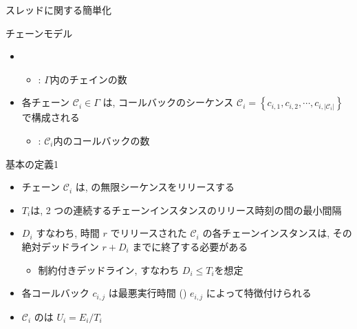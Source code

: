 \begin{frame}{スレッドに関する簡単化}
\end{frame}

\begin{frame}{チェーンモデル}

    \begin{itemize}
        \item {}\\
        \begin{itemize}
            \item \db{$|\Gamma|$}: $\Gamma$内のチェインの数
        \end{itemize}
        \item 各チェーン $\mathcal{C}_{i} \in \Gamma$ は, コールバックのシーケンス $\mathcal{C}_{i}=\left\{c_{i, 1}, c_{i, 2}, \cdots, c_{i,\left|\mathcal{C}_{i}\right|}\right\}$ で構成される
        \begin{itemize}
            \item {}: $\mathcal{C}_{i}$内のコールバックの数
        \end{itemize}
    \end{itemize}
\end{frame}

\begin{frame}{基本の定義1}
    \begin{itemize}
        \item チェーン $\mathcal{C}_{i}$ は, の無限シーケンスをリリースする
        \item {} $T_{i}$は, 2 つの連続するチェーンインスタンスのリリース時刻の間の最小間隔
        \item {} $D_{i}$ すなわち, 時間 $r$ でリリースされた $\mathcal{C}_{i}$ の各チェーンインスタンスは, その絶対デッドライン $r+D_{i}$ までに終了する必要がある
              \begin{itemize}
                  \item 制約付きデッドライン, すなわち $D_{i} \leq T_{i}$を想定
              \end{itemize}
        \item 各コールバック $c_{i, j}$ は最悪実行時間 () $e_{i, j}$ によって特徴付けられる
        \item $\mathcal{C}_{i}$ のは $U_{i}=E_{i} / T_{i}$
    \end{itemize}
\end{frame}

